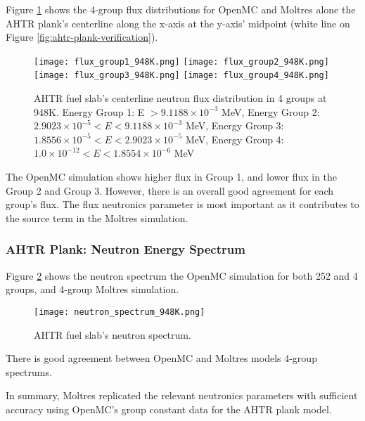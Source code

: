 Figure \ref{fig:flux_948K} shows the 4-group flux distributions for OpenMC and 
Moltres alone the \gls{AHTR} plank's centerline along the x-axis at the y-axis' 
midpoint (white line on Figure \ref{fig:ahtr-plank-verification}). 
\begin{figure}[htbp]
    \centering
    \texttt{[image: flux\_group1\_948K.png]} 
    \texttt{[image: flux\_group2\_948K.png]} 
    \texttt{[image: flux\_group3\_948K.png]} 
    \texttt{[image: flux\_group4\_948K.png]} 
    \caption{AHTR fuel slab's centerline neutron flux distribution in 4 groups
    at 948K. 
    Energy Group 1: E $> 9.1188 \times 10^{-3}$ MeV, 
    Energy Group 2: $2.9023 \times 10^{-5} < E < 9.1188 \times 10^{-3}$ MeV,
    Energy Group 3:  $1.8556 \times 10^{-5} < E < 2.9023 \times 10^{-5}$ MeV,
    Energy Group 4:  $1.0 \times 10^{-12} < E < 1.8554 \times 10^{-6}$ MeV}
    \label{fig:flux_948K}
\end{figure}
The OpenMC simulation shows higher flux in Group 1, and lower flux in the
Group 2 and Group 3. 
However, there is an overall good agreement for each group's flux.
The flux neutronics parameter is most important as it contributes to the 
source term in the Moltres simulation. 

\subsubsection{AHTR Plank: Neutron Energy Spectrum}
Figure \ref{fig:neutron_spectrum_948K} shows the neutron spectrum the OpenMC simulation 
for both 252 and 4 groups, and 4-group Moltres simulation. 
 \begin{figure}[htbp]
    \centering
    \texttt{[image: neutron\_spectrum\_948K.png]}
    \caption{AHTR fuel slab's neutron spectrum.}  
    \label{fig:neutron_spectrum_948K}
\end{figure}
There is good agreement between OpenMC and Moltres models 4-group spectrums. 

In summary, Moltres replicated the relevant neutronics parameters with sufficient 
accuracy using OpenMC's group constant data for the \gls{AHTR} plank model. 

